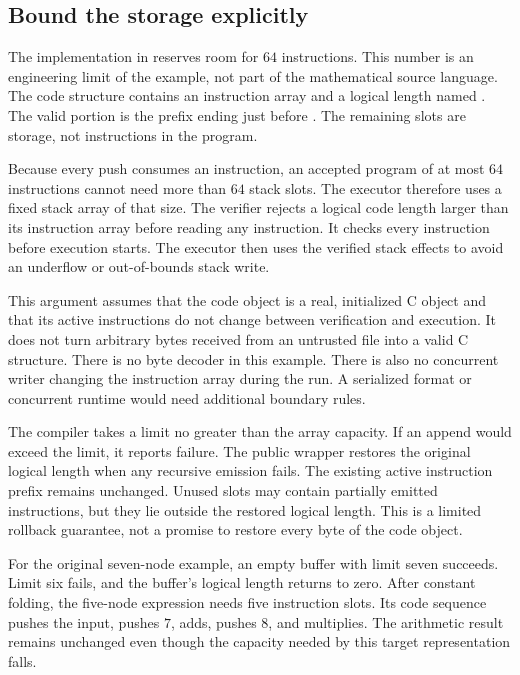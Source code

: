 \subsection{Bound the storage explicitly}
\label{sec:tiny-stack-storage}

The implementation in  reserves room for $64$ instructions.
This number is an engineering limit of the example, not part of the mathematical source language.
The code structure contains an instruction array and a logical length named .
The valid portion is the prefix ending just before .
The remaining slots are storage, not instructions in the program.

Because every push consumes an instruction, an accepted program of at most $64$ instructions cannot need more than $64$ stack slots.
The executor therefore uses a fixed stack array of that size.
The verifier rejects a logical code length larger than its instruction array before reading any instruction.
It checks every instruction before execution starts.
The executor then uses the verified stack effects to avoid an underflow or out-of-bounds stack write.

This argument assumes that the code object is a real, initialized C object and that its active instructions do not change between verification and execution.
It does not turn arbitrary bytes received from an untrusted file into a valid C structure.
There is no byte decoder in this example.
There is also no concurrent writer changing the instruction array during the run.
A serialized format or concurrent runtime would need additional boundary rules.

The compiler takes a limit no greater than the array capacity.
If an append would exceed the limit, it reports failure.
The public wrapper restores the original logical length when any recursive emission fails.
The existing active instruction prefix remains unchanged.
Unused slots may contain partially emitted instructions, but they lie outside the restored logical length.
This is a limited rollback guarantee, not a promise to restore every byte of the code object.

For the original seven-node example, an empty buffer with limit seven succeeds.
Limit six fails, and the buffer's logical length returns to zero.
After constant folding, the five-node expression needs five instruction slots.
Its code sequence pushes the input, pushes $7$, adds, pushes $8$, and multiplies.
The arithmetic result remains unchanged even though the capacity needed by this target representation falls.

